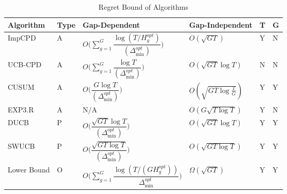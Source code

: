\begin{table}[!th]
\begin{center}
\vspace*{-1.5em}
\caption{Regret Bound of Algorithms}
\label{tab:comp-bds}
\begin{tabular}{|p{4 em}|p{1em}|p{10em}|p{7em}|p{1em}|p{1em}|}
\toprule
Algorithm  &   \hspace*{1mm}Type &Gap-Dependent & Gap-Independent & T & G \\
\hline
ImpCPD        & A &$O\big(\sum\limits_{g=1}^G\dfrac{\log({T}/{H^{opt}_{g}})}{(\Delta^{opt}_{\min})}\big)$ & $O\left(\sqrt{GT}\right)$ & Y & N\\
UCB-CPD        & A &$O\big(\sum\limits_{g=1}^G\dfrac{\log T}{(\Delta^{opt}_{\min})}\big)$ & $O\left(\sqrt{GT}\log T\right)$ & N & N \\%
CUSUM             & A &$O\big(\dfrac{G\log T}{(\Delta^{opt}_{\min})}\big)$& $O\left( \sqrt{GT\log \frac{T}{G}}\right)$ & Y & Y \\%
EXP3.R         & A &N/A& $O\left( G\sqrt{T\log T}\right)$ & Y & N\\%
DUCB        & P &$O\big(\dfrac{\sqrt{GT}\log T}{(\Delta^{opt}_{\min})}\big)$& $O\left(\sqrt{GT}\log T\right)$ & Y & Y\\
SWUCB         & P &$O\big(\dfrac{\sqrt{GT\log T}}{(\Delta^{opt}_{\min})}\big)$& $O\left(\sqrt{GT\log T}\right)$ & Y & Y\\%
Lower Bound         & O &$O\big(\sum\limits_{g=1}^G\dfrac{ \log ({T}/{(GH^{opt}_g)})}{\Delta^{opt}_{\min}}\big)$ & $\Omega\left( \sqrt{GT}\right)$ & Y & Y\\\midrule
\end{tabular}
\vspace*{-2em}
\end{center}
\end{table}    

